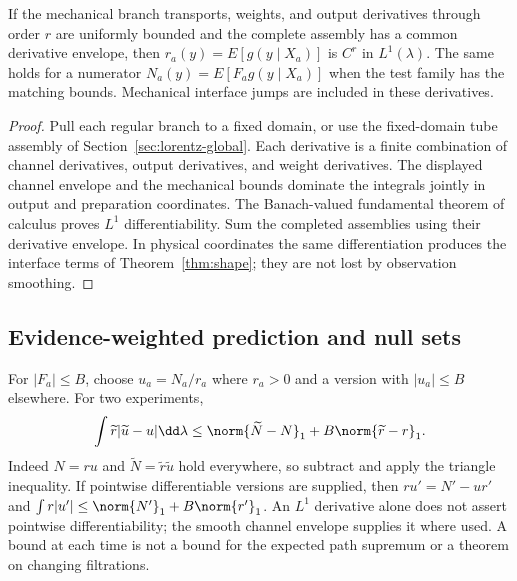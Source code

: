 \begin{proposition}\label{prop:smoothing}
If the mechanical branch transports, weights, and output derivatives through order $r$ are uniformly bounded and the complete assembly has a common derivative envelope, then $r_a(y)=E[g(y\mid X_a)]$ is $C^r$ in $L^1(\lambda)$. The same holds for a numerator $N_a(y)=E[F_ag(y\mid X_a)]$ when the test family has the matching bounds. Mechanical interface jumps are included in these derivatives.
\end{proposition}
\begin{proof}
Pull each regular branch to a fixed domain, or use the fixed-domain tube assembly of Section~\ref{sec:lorentz-global}. Each derivative is a finite combination of channel derivatives, output derivatives, and weight derivatives. The displayed channel envelope and the mechanical bounds dominate the integrals jointly in output and preparation coordinates. The Banach-valued fundamental theorem of calculus proves $L^1$ differentiability. Sum the completed assemblies using their derivative envelope. In physical coordinates the same differentiation produces the interface terms of Theorem~\ref{thm:shape}; they are not lost by observation smoothing.
\end{proof}

\subsection{Evidence-weighted prediction and null sets}
For $|F_a|\le B$, choose $u_a=N_a/r_a$ where $r_a>0$ and a version with $|u_a|\le B$ elsewhere. For two experiments,
\begin{equation}
 \int\widetilde r|\widetilde u-u|\dd\lambda
 \le\norm{\widetilde N-N}_1+B\norm{\widetilde r-r}_1.
 \label{eq:evidence}
\end{equation}
Indeed $N=ru$ and $\widetilde N=\widetilde r\widetilde u$ hold everywhere, so subtract and apply the triangle inequality. If pointwise differentiable versions are supplied, then $ru'=N'-ur'$ and
$\int r|u'|\le\norm{N'}_1+B\norm{r'}_1$.
An $L^1$ derivative alone does not assert pointwise differentiability; the smooth channel envelope supplies it where used. A bound at each time is not a bound for the expected path supremum or a theorem on changing filtrations.
\par

